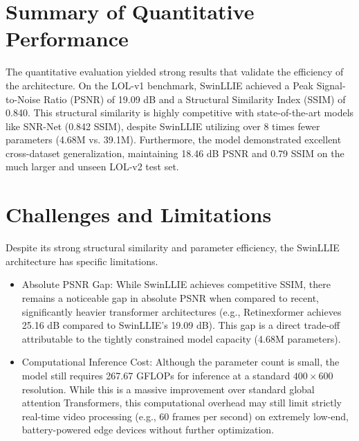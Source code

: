 \documentclass[12pt, a4paper]{report}
\begin{document}
\section{Summary of Quantitative Performance}
The quantitative evaluation yielded strong results that validate the efficiency of the architecture. On the LOL-v1 benchmark, SwinLLIE achieved a Peak Signal-to-Noise Ratio (PSNR) of 19.09 dB and a Structural Similarity Index (SSIM) of 0.840. This structural similarity is highly competitive with state-of-the-art models like SNR-Net (0.842 SSIM), despite SwinLLIE utilizing over 8 times fewer parameters (4.68M vs. 39.1M). Furthermore, the model demonstrated excellent cross-dataset generalization, maintaining 18.46 dB PSNR and 0.79 SSIM on the much larger and unseen LOL-v2 test set.

\section{Challenges and Limitations}
Despite its strong structural similarity and parameter efficiency, the SwinLLIE architecture has specific limitations.
\begin{itemize}
    \item Absolute PSNR Gap: While SwinLLIE achieves competitive SSIM, there remains a noticeable gap in absolute PSNR when compared to recent, significantly heavier transformer architectures (e.g., Retinexformer achieves 25.16 dB compared to SwinLLIE's 19.09 dB). This gap is a direct trade-off attributable to the tightly constrained model capacity (4.68M parameters).
    \item Computational Inference Cost: Although the parameter count is small, the model still requires 267.67 GFLOPs for inference at a standard $400 \times 600$ resolution. While this is a massive improvement over standard global attention Transformers, this computational overhead may still limit strictly real-time video processing (e.g., 60 frames per second) on extremely low-end, battery-powered edge devices without further optimization.
\end{itemize}
\end{document}
